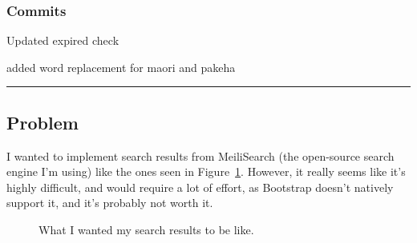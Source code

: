 \documentclass{article}
\begin{document}
\subsubsection*{Commits}
\begin{description}\small
    \item[\texttt{2067533}] Updated expired check
    \item[\texttt{a0e1d52}] added word replacement for maori and pakeha
\end{description}

\begin{center}
\rule{0.5\textwidth}{0.2pt}
\end{center}

\subsection*{Problem}
I wanted to implement search results from MeiliSearch (the open-source search engine I'm using) like the ones seen in Figure~\ref{fig:idealsearchresults}. However, it really seems like it's highly difficult, and would require a lot of effort, as Bootstrap doesn't natively support it, and it's probably not worth it.

\begin{figure}[h!]
    \centering
    \caption{What I wanted my search results to be like.}
    \label{fig:idealsearchresults}
\end{figure}
\end{document}
